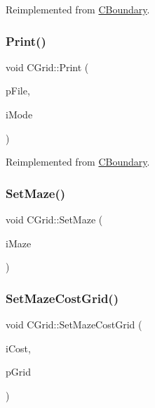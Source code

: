 Reimplemented from \mbox{\hyperlink{classCBoundary_a17bf8019eff54892a398e4b13c3ff264}{C\+Boundary}}.

\mbox{\label{classCGrid_a6462a8c5f7d7b6cbba02bac1d82dcbba}} 
\subsubsection{\texorpdfstring{Print()}{Print()}}
{\footnotesize\ttfamily void C\+Grid\+::\+Print (\begin{DoxyParamCaption}\item[{F\+I\+LE $\ast$}]{p\+File,  }\item[{int}]{i\+Mode }\end{DoxyParamCaption})\hspace{0.3cm}{\ttfamily [virtual]}}



Reimplemented from \mbox{\hyperlink{classCBoundary_a12a1e37297bd35f915544d02bd8c0cf1}{C\+Boundary}}.

\mbox{\label{classCGrid_ab8f8f688a787fb740321dd53bdcb3f00}} 
\subsubsection{\texorpdfstring{SetMaze()}{SetMaze()}}
{\footnotesize\ttfamily void C\+Grid\+::\+Set\+Maze (\begin{DoxyParamCaption}\item[{int}]{i\+Maze }\end{DoxyParamCaption})\hspace{0.3cm}{\ttfamily [inline]}}

\mbox{\label{classCGrid_aec202544655ecef4303ab81e2d386e27}} 
\subsubsection{\texorpdfstring{SetMazeCostGrid()}{SetMazeCostGrid()}\hspace{0.1cm}{\footnotesize\ttfamily [1/2]}}
{\footnotesize\ttfamily void C\+Grid\+::\+Set\+Maze\+Cost\+Grid (\begin{DoxyParamCaption}\item[{int}]{i\+Cost,  }\item[{\mbox{\hyperlink{classCGrid}{C\+Grid}} $\ast$}]{p\+Grid }\end{DoxyParamCaption})\hspace{0.3cm}{\ttfamily [inline]}}

